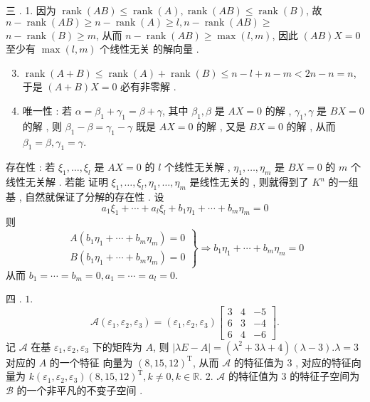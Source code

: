 \documentclass[10pt]{article}
\begin{document}
 三 . 1.  因为  $\operatorname{rank}(A B) \leqslant \operatorname{rank}(A), \operatorname{rank}(A B) \leqslant \operatorname{rank}(B)$,  故  $n-\operatorname{rank}(A B) \geqslant n-\operatorname{rank}(A) \geqslant l, n-\operatorname{rank}(A B) \geqslant$ $n-\operatorname{rank}(B) \geqslant m$,  从而  $n-\operatorname{rank}(A B) \geqslant \max (l, m)$,  因此  $(A B) X=0$  至少有  $\max (l, m)$  个线性无关   的解向量 .

\begin{enumerate}
  \setcounter{enumi}{2}
  \item $\operatorname{rank}(A+B) \leqslant \operatorname{rank}(A)+\operatorname{rank}(B) \leqslant n-l+n-m<2 n-n=n$,  于是  $(A+B) X=0$  必有非零解 .

  \item  唯一性 :  若  $\alpha=\beta_{1}+\gamma_{1}=\beta+\gamma$,  其中  $\beta_{1}, \beta$  是  $A X=0$  的解 , $\gamma_{1}, \gamma$  是  $B X=0$  的解 ,  则  $\beta_{1}-\beta=\gamma_{1}-\gamma$  既是  $A X=0$  的解 ,  又是  $B X=0$  的解 ,  从而  $\beta_{1}=\beta, \gamma_{1}=\gamma$.

\end{enumerate}
 存在性 :  若  $\xi_{1}, \ldots, \xi_{l}$  是  $A X=0$  的  $l$  个线性无关解 , $\eta_{1}, \ldots, \eta_{m}$  是  $B X=0$  的  $m$  个线性无关解 .  若能   证明  $\xi_{1}, \ldots, \xi_{l}, \eta_{1}, \ldots, \eta_{m}$  是线性无关的 ,  则就得到了  $K^{n}$  的一组基 ,  自然就保证了分解的存在性 .  设 
$$
a_{1} \xi_{1}+\cdots+a_{l} \xi_{l}+b_{1} \eta_{1}+\cdots+b_{m} \eta_{m}=0
$$
 则 
$$
\left.\begin{array}{l}
A\left(b_{1} \eta_{1}+\cdots+b_{m} \eta_{m}\right)=0 \\
B\left(b_{1} \eta_{1}+\cdots+b_{m} \eta_{m}\right)=0
\end{array}\right\} \Longrightarrow b_{1} \eta_{1}+\cdots+b_{m} \eta_{m}=0
$$
 从而  $b_{1}=\cdots=b_{m}=0, a_{1}=\cdots=a_{l}=0$.

 四 . $1 .$
$$
\mathscr{A}\left(\varepsilon_{1}, \varepsilon_{2}, \varepsilon_{3}\right)=\left(\varepsilon_{1}, \varepsilon_{2}, \varepsilon_{3}\right)\left[\begin{array}{ccc}
3 & 4 & -5 \\
6 & 3 & -4 \\
6 & 4 & -6
\end{array}\right] .
$$
 记  $\mathscr{A}$  在基  $\varepsilon_{1}, \varepsilon_{2}, \varepsilon_{3}$  下的矩阵为  $A$,  则  $|\lambda E-A|=\left(\lambda^{2}+3 \lambda+4\right)(\lambda-3) . \lambda=3$  对应的  $A$  的一个特征   向量为  $(8,15,12)^{\mathrm{T}}$,  从而  $\mathscr{A}$  的特征值为  3 ,  对应的特征向量为  $k\left(\varepsilon_{1}, \varepsilon_{2}, \varepsilon_{3}\right)(8,15,12)^{\mathrm{T}}, k \neq 0, k \in \mathbb{R}$. 2. $\mathscr{A}$  的特征值为  3  的特征子空间为  $\mathscr{B}$  的一个非平凡的不变子空间 .
\end{document}
